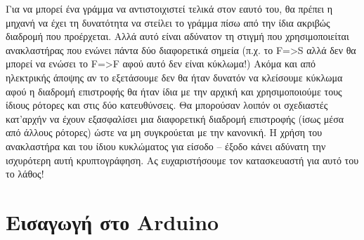 \documentclass[a4paper,twoside,12pt]{article}
\begin{document}
Για να μπορεί ένα γράμμα να αντιστοιχιστεί τελικά στον εαυτό του, θα πρέπει η μηχανή να έχει τη δυνατότητα να στείλει το γράμμα πίσω από την ίδια ακριβώς διαδρομή που προέρχεται. Αλλά αυτό είναι αδύνατον τη στιγμή που χρησιμοποιείται ανακλαστήρας που ενώνει πάντα δύο διαφορετικά σημεία (π.χ. το F=>S αλλά δεν θα μπορεί να ενώσει το F=>F αφού αυτό δεν είναι κύκλωμα!) Ακόμα και από ηλεκτρικής άποψης αν το εξετάσουμε δεν θα ήταν δυνατόν να κλείσουμε κύκλωμα αφού η διαδρομή επιστροφής θα ήταν ίδια με την αρχική και χρησιμοποιούμε τους ίδιους ρότορες και στις δύο κατευθύνσεις. Θα μπορούσαν λοιπόν οι σχεδιαστές κατ'αρχήν να έχουν εξασφαλίσει μια διαφορετική διαδρομή επιστροφής (ίσως μέσα από άλλους ρότορες) ώστε να μη συγκρούεται με την κανονική. Η χρήση του ανακλαστήρα και του ίδιου κυκλώματος για είσοδο – έξοδο κάνει αδύνατη την ισχυρότερη αυτή κρυπτογράφηση. Ας ευχαριστήσουμε τον κατασκευαστή για αυτό του το λάθος!
\newpage
%
\section{Εισαγωγή στο Arduino}
\end{document}
